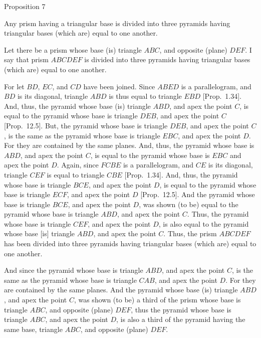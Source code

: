 
\begin{center}
{\large Proposition 7}
\end{center}

Any prism having a triangular base is divided into three pyramids having triangular bases (which are) equal to
one another.

\epsfysize=2.5in
\centerline{}

Let there be a prism whose base (is) triangle $ABC$, and opposite (plane) $DEF$. I say that
prism $ABCDEF$ is divided into three pyramids having
triangular bases (which are) equal to one another.

For let $BD$, $EC$, and $CD$ have been joined. Since $ABED$ is a parallelogram, and $BD$ is its diagonal, triangle $ABD$ is thus equal to triangle $EBD$ [Prop.~1.34]. And, thus,
the pyramid whose base (is) triangle $ABD$, and apex the point $C$, is equal to the pyramid
whose base is triangle $DEB$, and apex the point $C$ [Prop.~12.5]. But,
the pyramid whose base is triangle $DEB$, and apex the point $C$, is the same as the pyramid whose
base is triangle $EBC$, and apex the point $D$. For they are contained
by the same planes. And, thus, the pyramid whose base is $ABD$, and
apex the point $C$, is equal to the pyramid whose base is $EBC$ and
apex the point $D$. 
Again, since $FCBE$ is a parallelogram, and
$CE$ is its diagonal, triangle $CEF$ is equal to triangle $CBE$ [Prop.~1.34].
And, thus, the pyramid whose base is triangle $BCE$, and apex the point $D$, is equal to the
pyramid whose base is triangle $ECF$, and apex the point $D$ [Prop.~12.5]. And the pyramid whose base
is triangle $BCE$, and apex the point $D$, was shown (to be) equal to the pyramid whose base is
triangle $ABD$, and apex the point $C$. Thus, the pyramid whose base is triangle $CEF$,
and apex the point $D$, is also equal to the pyramid whose base [is] triangle $ABD$, and apex
the point $C$. Thus, the prism $ABCDEF$ has been divided into three pyramids having triangular bases
(which are) equal to one another.

And since the pyramid whose base is triangle $ABD$, and apex the point $C$, is the
same as the pyramid whose base is triangle $CAB$, and apex the point $D$. For they are contained
by the same planes. And the pyramid whose base (is) triangle $ABD$, and apex the point
$C$, was shown (to be) a third of the prism whose base is triangle $ABC$, and opposite
(plane) $DEF$, thus the pyramid whose base is triangle $ABC$, and apex the point $D$, is  also
a third of the pyramid having the same base, triangle $ABC$, and opposite (plane)  $DEF$.


